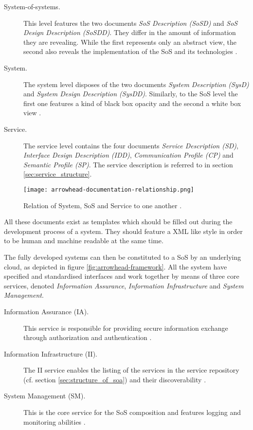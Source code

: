\begin{description}
\item [System-of-systems.] This level features the two documents \emph{SoS Description (SoSD)} and \emph{SoS Design Description (SoSDD)}. They differ in the amount of information they are revealing. While the first represents only an abstract view, the second also reveals the implementation of the SoS and its technologies \cite{arrowhead_inpr}.
\item [System.] The system level disposes of the two documents \emph{System Description (SysD)} and \emph{System Design Description (SysDD)}. Similarly, to the SoS level the first one features a kind of black box opacity and the second a white box view \cite{arrowhead_inpr}.
\item [Service.] The service level contains the four documents \emph{Service Description (SD)}, \emph{Interface Design Description (IDD)}, \emph{Communication Profile (CP)} and \emph{Semantic Profile (SP)}. The service description is referred to in section \ref{sec:service_structure}.
\end{description}

\begin{figure}[!htbp]
\centering
\texttt{[image: arrowhead-documentation-relationship.png]}
\caption{Relation of System, SoS and Service to one another \cite{arrowhead:presentation}.}
\label{fig:sys-arrowhead}
\end{figure}

All these documents exist as templates which should be filled out during the development process of a system. They should feature a XML like style in order to be human and machine readable at the same time.

The fully developed systems can then be constituted to a SoS by an underlying cloud, as depicted in figure \ref{fig:arrowhead-framework}. All the system have specified and standardised interfaces and work together by means of three core services, denoted \emph{Information Assurance}, \emph{Information Infrastructure} and \emph{System Management}.

\begin{description}
\item [Information Assurance (IA).]
This service is responsible for providing secure information exchange through authorization and authentication \cite{arrowhead:presentation}.
\item [Information Infrastructure (II).]
The II service enables the listing of the services in the service repository  (cf. section \ref{sec:structure_of_soa}) and their discoverability \cite{arrowhead:presentation}.
\item [System Management (SM).]
This is the core service for the SoS composition and features logging and monitoring abilities \cite{arrowhead:presentation}.
\end{description}

